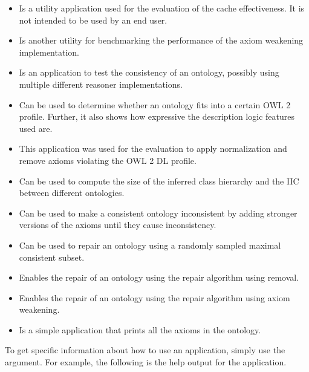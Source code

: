 \begin{itemize}
    \item {} \enspace Is a utility application used for the evaluation of the cache effectiveness. It is not intended to be used by an end user.
    \item {} \enspace Is another utility for benchmarking the performance of the axiom weakening implementation.
    \item {} \enspace Is an application to test the consistency of an ontology, possibly using multiple different reasoner implementations.
    \item {} \enspace Can be used to determine whether an ontology fits into a certain OWL 2 profile. Further, it also shows how expressive the description logic features used are.
    \item {} \enspace This application was used for the evaluation to apply normalization and remove axioms violating the OWL 2 DL profile.
    \item {} \enspace Can be used to compute the size of the inferred class hierarchy and the IIC between different ontologies.
    \item {} \enspace Can be used to make a consistent ontology inconsistent by adding stronger versions of the axioms until they cause inconsistency.
    \item {} \enspace Can be used to repair an ontology using a randomly sampled maximal consistent subset.
    \item {} \enspace Enables the repair of an ontology using the repair algorithm using removal.
    \item {} \enspace Enables the repair of an ontology using the repair algorithm using axiom weakening.
    \item {} \enspace Is a simple application that prints all the axioms in the ontology.
\end{itemize}

To get specific information about how to use an application, simply use the  argument. For example, the following is the help output for the  application.

